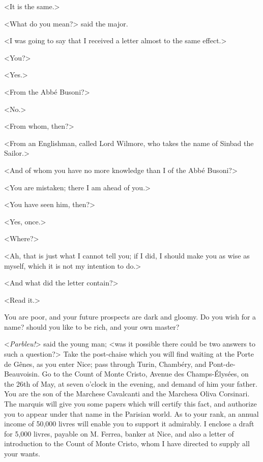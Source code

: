  <It is the same.> 

 <What do you mean?> said the major. 

 <I was going to say that I received a letter almost to the same effect.> 

 <You?> 

 <Yes.> 

 <From the Abbé Busoni?> 

 <No.> 

 <From whom, then?> 

 <From an Englishman, called Lord Wilmore, who takes the name of Sinbad the Sailor.> 

 <And of whom you have no more knowledge than I of the Abbé Busoni?> 

 <You are mistaken; there I am ahead of you.> 

 <You have seen him, then?> 

 <Yes, once.> 

 <Where?> 

 <Ah, that is just what I cannot tell you; if I did, I should make you as wise as myself, which it is not my intention to do.> 

 <And what did the letter contain?> 

 <Read it.> 
 
 \begin{a4}
 \vspace{-1em}
 \end{a4}
 \begin{mail}{}{}
You are poor, and your future prospects are dark and gloomy. Do you wish for a name? should you like to be rich, and your own master?

\pausemail
 <\textit{Parbleu!}> said the young man; <was it possible there could be two answers to such a question?>  
 \resumemail
Take the post-chaise which you will find waiting at the Porte de Gênes, as you enter Nice; pass through Turin, Chambéry, and Pont-de-Beauvoisin. Go to the Count of Monte Cristo, Avenue des Champs-Élysées, on the 26th of May, at seven o'clock in the evening, and demand of him your father. You are the son of the Marchese Cavalcanti and the Marchesa Oliva Corsinari. The marquis will give you some papers which will certify this fact, and authorize you to appear under that name in the Parisian world. As to your rank, an annual income of 50,000 livres will enable you to support it admirably. I enclose a draft for 5,000 livres, payable on M. Ferrea, banker at Nice, and also a letter of introduction to the Count of Monte Cristo, whom I have directed to supply all your wants. 

\end{mail}

